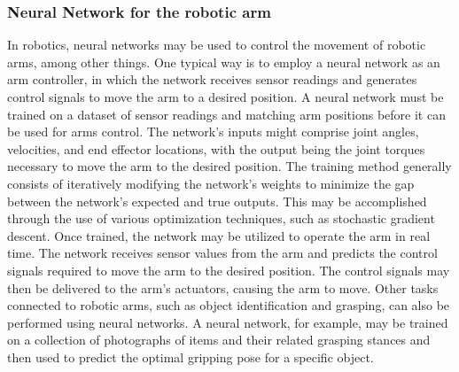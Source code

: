 \documentclass[12pt,oneside]{article}
\begin{document}
\subsubsection{Neural Network for the robotic arm}
In robotics, neural networks may be used to control the movement of robotic arms, among other things. One typical way is to employ a neural network as an arm controller, in which the network receives sensor readings and generates control signals to move the arm to a desired position.
A neural network must be trained on a dataset of sensor readings and matching arm positions before it can be used for arms control. The network's inputs might comprise joint angles, velocities, and end effector locations, with the output being the joint torques necessary to move the arm to the desired position.
The training method generally consists of iteratively modifying the network's weights to minimize the gap between the network's expected and true outputs. This may be accomplished through the use of various optimization techniques, such as stochastic gradient descent. Once trained, the network may be utilized to operate the arm in real time. The network receives sensor values from the arm and predicts the control signals required to move the arm to the desired position. The control signals may then be delivered to the arm's actuators, causing the arm to move. Other tasks connected to robotic arms, such as object identification and grasping, can also be performed using neural networks. A neural network, for example, may be trained on a collection of photographs of items and their related grasping stances and then used to predict the optimal gripping pose for a specific object.
\end{document}

